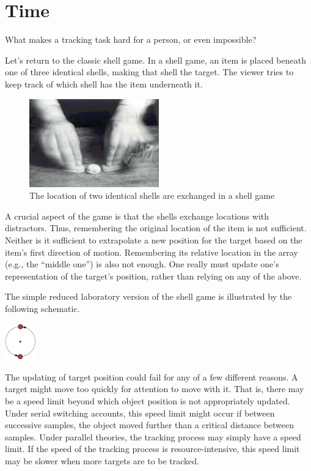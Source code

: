 \documentclass[]{book}
\begin{document}
\hypertarget{time}{%
\section{Time}\label{time}}

What makes a tracking task hard for a person, or even impossible?

Let's return to the classic shell game. In a shell game, an item is placed beneath one of three identical shells, making that shell the target. The viewer tries to keep track of which shell has the item underneath it.

\begin{figure}
\centering
\includegraphics[width=0.5\textwidth,height=\textheight]{imagesForRmd/shellGame.png}
\caption{The location of two identical shells are exchanged in a shell game}
\end{figure}

A crucial aspect of the game is that the shells exchange locations with distractors. Thus, remembering the original location of the item is not sufficient. Neither is it sufficient to extrapolate a new position for the target based on the item's first direction of motion. Remembering its relative location in the array (e.g., the ``middle one'') is also not enough. One really must update one's representation of the target's position, rather than relying on any of the above.

The simple reduced laboratory version of the shell game is illustrated by the following schematic.

\includegraphics[width=0.1\textwidth,height=\textheight]{imagesForRmd/twoDiscsRevolving.png}

The updating of target position could fail for any of a few different reasons. A target might move too quickly for attention to move with it. That is, there may be a speed limit beyond which object position is not appropriately updated. Under serial switching accounts, this speed limit might occur if between successive samples, the object moved further than a critical distance between samples. Under parallel theories, the tracking process may simply have a speed limit. If the speed of the tracking process is resource-intensive, this speed limit may be slower when more targets are to be tracked.
\end{document}
